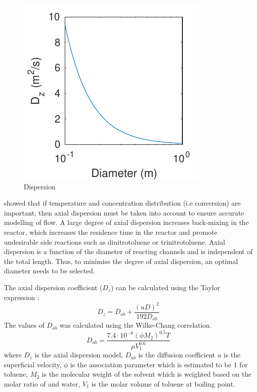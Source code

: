 \begin{figure}
    \vspace{-\intextsep}
    \includegraphics[scale=0.9]{figures/D_z}
    \caption{Dispersion}
    \label{fig:dispersion}
\end{figure}
\textcite{young_axial_1973} showed that if temperature and concentration distribution (i.e conversion) are important, then axial dispersion must be taken into account to ensure accurate modelling of flow. A large degree of axial dispersion increases back-mixing in the reactor, which increases the residence time in the reactor and promote undesirable side reactions such as dinitrotoluene or trinitrotoluene. Axial dispersion is a function of the diameter of reacting channels and is independent of the total length. Thus, to minimise the degree of axial dispersion, an optimal diameter needs to be selected. 

The axial dispersion coefficient ($D_z$) can be calculated using the Taylor expression \cite{froment_chemical_2011}: 
\begin{equation}
    D_z=D_{ab}+\frac{(uD)^2}{192D_{ab}}
    \label{eq: axial dispersion coefficient}
\end{equation}
The values of $D_{ab}$ was calculated using the Wilke-Chang correlation.
\begin{equation}
    D_{ab}=\frac{7.4\cdot 10^{-8}(\phi M_2)^{0.5}T}{\mu V_1^{0.6}}
    \label{wilkechang}
\end{equation}
where $D_z$ is the axial dispersion model, $D_{ab}$ is the diffusion coefficient $u$ is the superficial velocity, $\phi$ is the association parameter which is estimated to be 1 for toluene, $M_2$ is the molecular weight of the solvent which is weighted based on the molar ratio of  and water, $V_1$ is the molar volume of toluene at boiling point.

